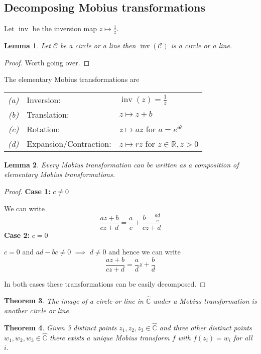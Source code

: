 \documentclass[11pt]{article}
\DeclareMathOperator{\inv}{\text{inv}}
\newcommand{\R}{\mathbb{R}}
\newcommand{\C}{\mathbb{C}}
\newenvironment{defin}
	{\begin{mdframed}[backgroundcolor=white, roundcorner=5pt, linewidth=1pt]}
	{\end{mdframed}}
\newcommand{\mdf}[1]{{\color{red} #1}}
\newtheorem{theorem}{Theorem}[section]
\newtheorem{lemma}[theorem]{Lemma}
\begin{document}
\subsection{Decomposing Mobius transformations}
Let $\inv$ be the inversion map $z\mapsto\frac{1}{z}$.
\begin{lemma}
Let $\mathcal{C}$ be a circle or a line then $\inv(\mathcal{C})$ is a circle or a line.
\end{lemma}
\begin{proof}
Worth going over.
\end{proof}

\begin{defin}
	The \mdf{elementary Mobius transformations} are
	
	\begin{tabular}{rll}
		\textit{(a)} & \mdf{Inversion}: & $\inv(z)=\frac{1}{z}$ \\
		\textit{(b)} & \mdf{Translation}: & $z\mapsto z+b$\\
		\textit{(c)} & \mdf{Rotation}: & $z\mapsto az$ for $a=e^{i\theta}$\\
		\textit{(d)} & \mdf{Expansion/Contraction}: & $z \mapsto rz$ for $z\in\R, z>0$
	\end{tabular}
\end{defin}

\begin{lemma}
Every Mobius transformation can be written as a composition of elementary Mobius transformations.
\end{lemma}

\begin{proof}
\textbf{Case 1:} $c\neq 0$

We can write 
\[
\frac{az+b}{cz+d}=\frac{a}{c}+\frac{b-\frac{ad}{c}}{cz+d}
\]
\textbf{Case 2:} $c=0$

$c=0$ and $ad-bc\neq 0$ $\implies$ $d\neq 0$ and hence we can write 
\[
\frac{az+b}{cz+d}=\frac{a}{d}z + \frac{b}{d}
\]

In both cases these transformations can be easily decomposed.
\end{proof}

\begin{theorem}
The image of a circle or line in $\hat{\C}$ under a Mobius transformation is another circle or line.
\end{theorem}

\begin{theorem}
Given 3 distinct points $z_1, z_2, z_3\in\hat{\C}$ and three other distinct points $w_1, w_2, w_3\in\hat{\C}$ there exists a unique Mobius transform $f$ with $f(z_i)=w_i$ for all $i$.
\end{theorem}
\end{document}

